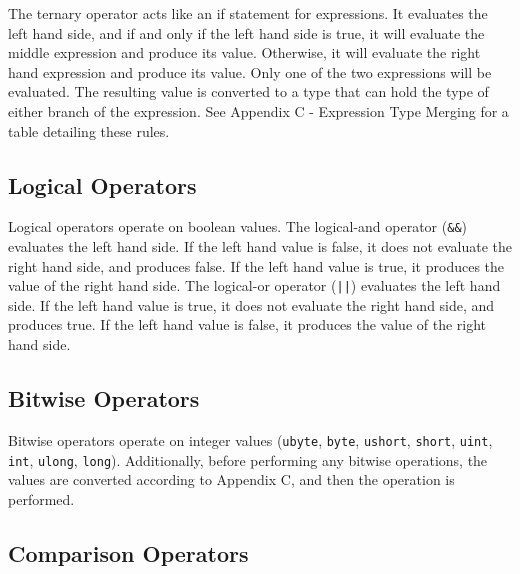 \documentclass[letterpaper,12pt]{book}
\begin{document}


The ternary operator acts like an if statement for expressions. It evaluates the left hand side, and if and only if the left hand side is true, it will evaluate the middle expression and produce its value. Otherwise, it will evaluate the right hand expression and produce its value. Only one of the two expressions will be evaluated. The resulting value is converted to a type that can hold the type of either branch of the expression. See Appendix C - Expression Type Merging for a table detailing these rules.

\subsection{Logical Operators}



Logical operators operate on boolean values. The logical-and operator (\texttt{\&\&}) evaluates the left hand side. If the left hand value is false, it does not evaluate the right hand side, and produces false. If the left hand value is true, it produces the value of the right hand side. The logical-or operator (\texttt{||}) evaluates the left hand side. If the left hand value is true, it does not evaluate the right hand side, and produces true. If the left hand value is false, it produces the value of the right hand side.

\subsection{Bitwise Operators}



Bitwise operators operate on integer values (\texttt{ubyte}, \texttt{byte}, \texttt{ushort}, \texttt{short}, \texttt{uint}, \texttt{int}, \texttt{ulong}, \texttt{long}). Additionally, before performing any bitwise operations, the values are converted according to Appendix C, and then the operation is performed.

\subsection{Comparison Operators}


\end{document}
